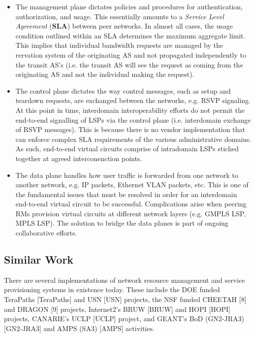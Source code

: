 \documentclass[conference]{IEEEtran}
\begin{document}
\begin{itemize}
\item
The management plane dictates policies and procedures for authentication, 
authorization, and usage.  This essentially amounts to a \emph{Service Level 
Agreement} (\textbf{SLA}) between peer networks.  In almost all cases, the usage 
condition outlined within an SLA determines the maximum aggregate limit.  
This implies that individual bandwidth requests are managed by the rervation 
system of the originating AS and not propagated independently to the transit AS's 
(i.e. the transit AS will see the request as coming from the originating AS and not the individual making the request).

\item
The control plane dictates the way control messages, such as setup and 
teardown requests, are exchanged between the networks, e.g. RSVP signaling.
At this point in time, interdomain interoperability efforts do not permit
the end-to-end signalling of LSPs via the control plane (i.e. interdomain exchange of RSVP messages).  This is because
there is no vendor implementation that can enforce complex SLA requirements of the
various administrative domains.  As such, end-to-end virtual circuits comprise
of intradomain LSPs stiched together at agreed interconenction points.

\item
The data plane handles how user traffic is forwarded from one network to 
another network, e.g. IP packets, Ethernet VLAN packets, etc.  This is one of the fundamental issues that must be resolved in order for an interdomain end-to-end virtual circuit to be successful.  Complications arise when peering RMs provision virtual circuits at different network layers (e.g. GMPLS LSP, MPLS LSP).  The solution to bridge the data planes is part of ongoing collaborative efforts.
\end{itemize}


\subsection{Similar Work}

There are several implementations of network resource management and
service provisioning systems in existence today.  These include the DOE funded
TeraPaths [TeraPaths] and USN [USN] projects, the NSF funded CHEETAH [8] and DRAGON [9] projects,
Internet2's BRUW [BRUW] and HOPI [HOPI] projects,  CANARIE's UCLP [UCLP] project, and GEANT's
BoD (GN2-JRA3) [GN2-JRA3] and AMPS (SA3) [AMPS] activities.
\end{document}
